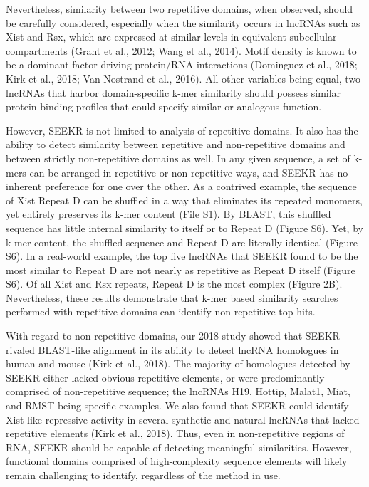 Nevertheless, similarity between two repetitive domains, when observed, should be carefully considered, especially when the similarity occurs in lncRNAs such as Xist and Rsx, which are expressed at similar levels in equivalent subcellular compartments (Grant et al., 2012; Wang et al., 2014). Motif density is known to be a dominant factor driving protein/RNA interactions (Dominguez et al., 2018; Kirk et al., 2018; Van Nostrand et al., 2016). All other variables being equal, two lncRNAs that harbor domain-specific k-mer similarity should possess similar protein-binding profiles that could specify similar or analogous function. 

However, SEEKR is not limited to analysis of repetitive domains. It also has the ability to detect similarity between repetitive and non-repetitive domains and between strictly non-repetitive domains as well. In any given sequence, a set of k-mers can be arranged in repetitive or non-repetitive ways, and SEEKR has no inherent preference for one over the other. As a contrived example, the sequence of Xist Repeat D can be shuffled in a way that eliminates its repeated monomers, yet entirely preserves its k-mer content (File S1). By BLAST, this shuffled sequence has little internal similarity to itself or to Repeat D (Figure S6). Yet, by k-mer content, the shuffled sequence and Repeat D are literally identical (Figure S6). In a real-world example, the top five lncRNAs that SEEKR found to be the most similar to Repeat D are not nearly as repetitive as Repeat D itself (Figure S6). Of all Xist and Rsx repeats, Repeat D is the most complex (Figure 2B). Nevertheless, these results demonstrate that k-mer based similarity searches performed with repetitive domains can identify non-repetitive top hits.

With regard to non-repetitive domains, our 2018 study showed that SEEKR rivaled BLAST-like alignment in its ability to detect lncRNA homologues in human and mouse  (Kirk et al., 2018). The majority of homologues detected by SEEKR either lacked obvious repetitive elements, or were predominantly comprised of non-repetitive sequence; the lncRNAs H19, Hottip, Malat1, Miat, and RMST being specific examples. We also found that SEEKR could identify Xist-like repressive activity in several synthetic and natural lncRNAs that lacked repetitive elements (Kirk et al., 2018). Thus, even in non-repetitive regions of RNA, SEEKR should be capable of detecting meaningful similarities. However, functional domains comprised of high-complexity sequence elements will likely remain challenging to identify, regardless of the method in use.

